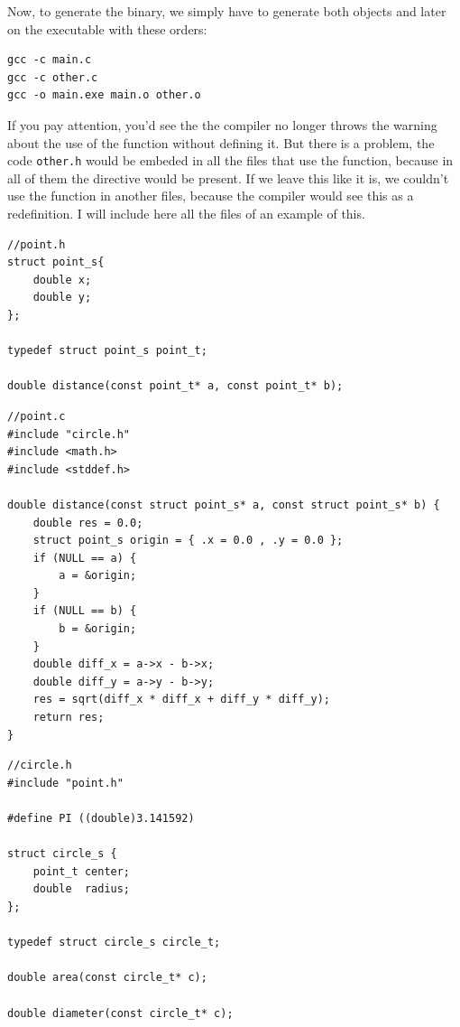 \documentclass[a4paper]{article}
\begin{document}
Now, to generate the binary, we simply have to generate both objects and later
on the executable with these orders:

\noindent
\begin{minipage}[H]{\linewidth}
\mbox{}
\begin{lstlisting}[style=terminalStyle]
gcc -c main.c
gcc -c other.c
gcc -o main.exe main.o other.o
\end{lstlisting}
\end{minipage}

If you pay attention, you'd see the the compiler no longer throws the warning
about the use of the function without defining it. But there is a problem, the
code \verb!other.h! would be embeded in all the files that use the function,
because in all of them the directive would be present. If we leave this like
it is, we couldn't use the function in another files, because the compiler would
see this as a redefinition. I will include here all the files of an example of
this.

\noindent
\begin{minipage}[H]{\linewidth}
\mbox{}
\begin{lstlisting}[style=C,
caption={Redefinition example -- \texttt{point.h}},
label={lst:redefInclude}]
//point.h
struct point_s{
    double x;
    double y;
};

typedef struct point_s point_t;

double distance(const point_t* a, const point_t* b);
\end{lstlisting}
\end{minipage}
\noindent
\begin{minipage}[H]{\linewidth}
\mbox{}
\begin{lstlisting}[style=C,
caption={Redefinition example -- \texttt{point.c}},
label={lst:redefInclude}]
//point.c
#include "circle.h"
#include <math.h>
#include <stddef.h>

double distance(const struct point_s* a, const struct point_s* b) {
    double res = 0.0;
    struct point_s origin = { .x = 0.0 , .y = 0.0 };
    if (NULL == a) {
        a = &origin;
    }
    if (NULL == b) {
        b = &origin;
    }
    double diff_x = a->x - b->x;
    double diff_y = a->y - b->y;
    res = sqrt(diff_x * diff_x + diff_y * diff_y);
    return res;
}
\end{lstlisting}
\end{minipage}
\noindent
\begin{minipage}[H]{\linewidth}
\mbox{}
\begin{lstlisting}[style=C,
caption={Redefinition example -- \texttt{circle.h}},
label={lst:redefInclude}]
//circle.h
#include "point.h"

#define PI ((double)3.141592)

struct circle_s {
    point_t center;
    double  radius;
};

typedef struct circle_s circle_t;

double area(const circle_t* c);

double diameter(const circle_t* c);
\end{lstlisting}
\end{minipage}
\end{document}
